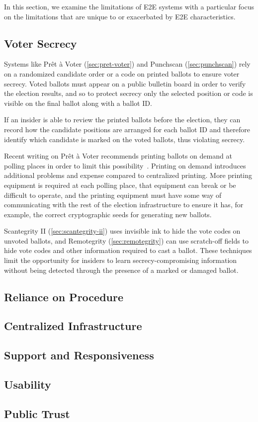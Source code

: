 In this section, we examine the limitations of E2E systems with a
particular focus on the limitations that are unique to or exacerbated
by E2E characteristics.

\subsection{Voter Secrecy}

Systems like Prêt à Voter (\ref{sec:pret-voter}) and Punchscan
(\ref{sec:punchscan}) rely on a randomized candidate order or a code
on printed ballots to ensure voter secrecy. Voted ballots must appear
on a public bulletin board in order to verify the election results,
and so to protect secrecy only the selected position or code is
visible on the final ballot along with a ballot ID.

If an insider is able to review the printed ballots before the
election, they can record how the candidate positions are arranged for
each ballot ID and therefore identify which candidate is marked on the
voted ballots, thus violating secrecy.

Recent writing on Prêt à Voter recommends printing ballots on demand
at polling places in order to limit this
possibility~\cite{ryan2009}. Printing on demand introduces additional
problems and expense compared to centralized printing. More printing
equipment is required at each polling place, that equipment can break
or be difficult to operate, and the printing equipment must have some
way of communicating with the rest of the election infrastructure to
ensure it has, for example, the correct cryptographic seeds for
generating new ballots.

Scantegrity II (\ref{sec:scantegrity-ii}) uses invisible ink to hide
the vote codes on unvoted ballots, and Remotegrity
(\ref{sec:remotegrity}) can use scratch-off fields to hide vote codes
and other information required to cast a ballot. These techniques
limit the opportunity for insiders to learn secrecy-compromising
information without being detected through the presence of a marked or
damaged ballot.

\subsection{Reliance on Procedure}

\subsection{Centralized Infrastructure}

\subsection{Support and Responsiveness}

\subsection{Usability}

\subsection{Public Trust}

